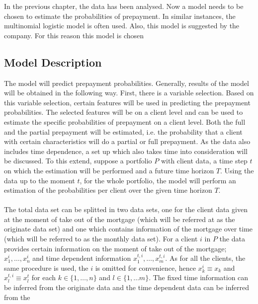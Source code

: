 In the previous chapter, the data has been analysed. Now a model needs to be chosen
to estimate the probabilities of prepayment. In similar instances, the multinomial 
logistic model is often used. Also, this model is suggested by the company. For this
reason this model is chosen 

\subsection{Model Description}
    The model will predict prepayment probabilities. Generally, results of the model 
    will be obtained in the following way. 
    First, there is a variable selection. Based on this variable
    selection, certain features will be used in predicting the prepayment  
    probabilities. The selected features will be on a client level and can be used to
    estimate the specific probabilities of prepayment on a client level. Both the 
    full and the partial prepayment will be estimated, i.e. the probability that 
    a client with certain characteristics will do a partial or full prepayment.
    As the data also includes time dependence, a set up which also takes time into
    consideration will be discussed. To this extend, suppose a portfolio $P$ with 
    client data, a time step $t$ on which the estimation will be performed and 
    a future time horizon $T$. Using the data up to the moment $t$, for the whole 
    portfolio, the model will perform an estimation of the probabilities per client
    over the given time horizon $T$. 
    \\\\ 
    The total data set can be splitted in two data sets, one for the client data 
    given at the moment of take out of the mortgage (which will be referred at as
    the originate data set) and one which contains information of the mortgage over 
    time (which will be referred to as the monthly data set). 
    For a client $i$ in $P$ the data provides certain information on the moment of 
    take out of the mortgage; $x_1^i, \ldots, x_n^i$ and time dependent information 
    $x_1^{t, i}, \ldots, x_m^{t, i}$. As for all the clients, the same procedure 
    is used, the $i$ is omitted for convenience, hence $x_k^i \equiv x_k$ and
    $x_l^{t, i} \equiv x_l^t$ for each $k \in \{1, \ldots, n\}$ and $l \in \{1, 
    \ldots m \}$.  
    The fixed time information can be inferred
    from the originate data and the time dependent data can be inferred from the 
